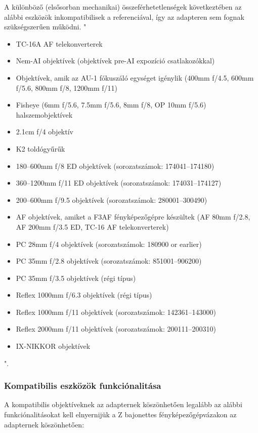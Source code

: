 A különböző (elsősorban mechanikai) összeférhetetlenségek következtében az alábbi eszközök inkompatibilisek a referenciával, így az adapteren sem fognak szükségszerűen működni.
"
\begin{itemize}
	\item TC-16A AF telekonverterek
	\item Nem-AI objektívek (objektívek pre-AI expozíció csatlakozókkal)
	\item Objektívek, amik az AU-1 fókuszáló egységet igénylik (400mm f/4.5, 600mm f/5.6, 800mm f/8, 1200mm f/11)
    \item Fisheye (6mm f/5.6, 7.5mm f/5.6, 8mm f/8, OP 10mm f/5.6) halszemobjektívek
    \item 2.1cm f/4 objektív
    \item K2 toldógyűrűk
    \item 180–600mm f/8 ED objektívek (sorozatszámok: 174041–174180)
    \item 360–1200mm f/11 ED objektívek (sorozatszámok: 174031–174127)
    \item 200–600mm f/9.5 objektívek (sorozatszámok: 280001–300490)
    \item AF objektívek, amiket a F3AF fényképezőgépre készültek (AF 80mm f/2.8, AF 200mm f/3.5 ED, TC-16 AF telekonverterek)
    \item PC 28mm f/4 objektívek (sorozatszámok: 180900 or earlier)
    \item PC 35mm f/2.8 objektívek (sorozatszámok: 851001–906200)
    \item PC 35mm f/3.5 objektívek (régi típus)
    \item Reflex 1000mm f/6.3 objektívek (régi típus)
    \item Reflex 1000mm f/11 objektívek (sorozatszámok: 142361–143000)
    \item Reflex 2000mm f/11 objektívek (sorozatszámok: 200111–200310)
    \item IX-NIKKOR objektívek
\end{itemize}
"\cite{Nikon_D6_referencia_használati_utasítás}. 

\subsubsection{Kompatibilis eszközök funkciónalitása}

A kompatibilis objektíveknek az adapternek köszönhetően legalább az alábbi funkciónalitásokat kell elnyernijük a Z bajonettes fényképezőgépvázakon az adapternek köszönhetően:

